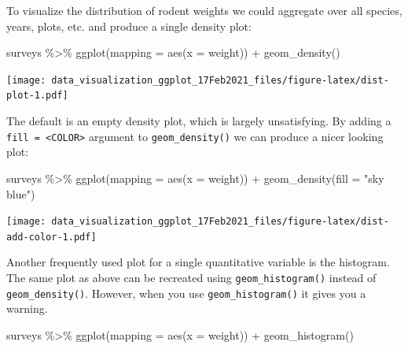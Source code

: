 \documentclass[
]{article}
\newenvironment{Shaded}{\begin{snugshade}}{\end{snugshade}}
\newcommand{\AttributeTok}[1]{\textcolor[rgb]{0.77,0.63,0.00}{#1}}
\newcommand{\FunctionTok}[1]{\textcolor[rgb]{0.00,0.00,0.00}{#1}}
\newcommand{\NormalTok}[1]{#1}
\newcommand{\SpecialCharTok}[1]{\textcolor[rgb]{0.00,0.00,0.00}{#1}}
\newcommand{\StringTok}[1]{\textcolor[rgb]{0.31,0.60,0.02}{#1}}
\begin{document}
To visualize the distribution of rodent weights we could aggregate over
all species, years, plots, etc. and produce a single density plot:

\begin{Shaded}
\begin{Highlighting}[]
\NormalTok{surveys }\SpecialCharTok{\%\textgreater{}\%} 
  \FunctionTok{ggplot}\NormalTok{(}\AttributeTok{mapping =} \FunctionTok{aes}\NormalTok{(}\AttributeTok{x =}\NormalTok{ weight)) }\SpecialCharTok{+} 
  \FunctionTok{geom\_density}\NormalTok{()}
\end{Highlighting}
\end{Shaded}

\texttt{[image: data\_visualization\_ggplot\_17Feb2021\_files/figure-latex/dist-plot-1.pdf]}

The default is an empty density plot, which is largely unsatisfying. By
adding a \texttt{fill\ =\ \textless{}COLOR\textgreater{}} argument to
\texttt{geom\_density()} we can produce a nicer looking plot:

\begin{Shaded}
\begin{Highlighting}[]
\NormalTok{surveys }\SpecialCharTok{\%\textgreater{}\%} 
  \FunctionTok{ggplot}\NormalTok{(}\AttributeTok{mapping =} \FunctionTok{aes}\NormalTok{(}\AttributeTok{x =}\NormalTok{ weight)) }\SpecialCharTok{+} 
  \FunctionTok{geom\_density}\NormalTok{(}\AttributeTok{fill =} \StringTok{"sky blue"}\NormalTok{)}
\end{Highlighting}
\end{Shaded}

\texttt{[image: data\_visualization\_ggplot\_17Feb2021\_files/figure-latex/dist-add-color-1.pdf]}

Another frequently used plot for a single quantitative variable is the
histogram. The same plot as above can be recreated using
\texttt{geom\_histogram()} instead of \texttt{geom\_density()}. However,
when you use \texttt{geom\_histogram()} it gives you a warning.

\begin{Shaded}
\begin{Highlighting}[]
\NormalTok{surveys }\SpecialCharTok{\%\textgreater{}\%} 
  \FunctionTok{ggplot}\NormalTok{(}\AttributeTok{mapping =} \FunctionTok{aes}\NormalTok{(}\AttributeTok{x =}\NormalTok{ weight)) }\SpecialCharTok{+} 
  \FunctionTok{geom\_histogram}\NormalTok{()}
\end{Highlighting}
\end{Shaded}
\end{document}

